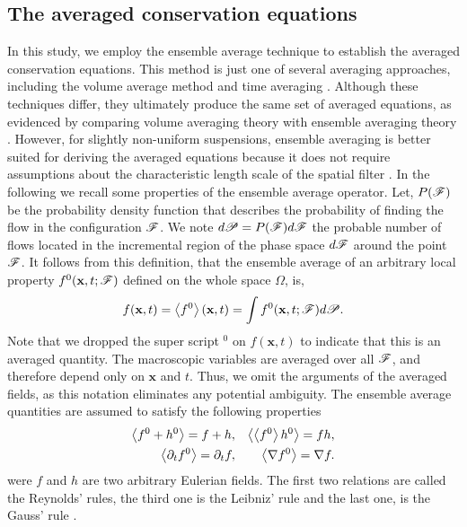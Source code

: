 \documentclass[11pt]{My_preprint}
\begin{document}
 \subsection{The averaged conservation equations}
\label{sec:avg_def}
In this study, we employ the ensemble average technique to establish the averaged conservation equations. 
This method is just one of several averaging approaches, including the volume average method \citep{jackson1997locally} and time averaging \citep{ishii2010thermo}. 
Although these techniques differ, they ultimately produce the same set of averaged equations, as evidenced by comparing volume averaging theory with ensemble averaging theory \citep{jackson1997locally,zhang1997momentum}. However, for slightly non-uniform suspensions, ensemble averaging is better suited for deriving the averaged equations because it does not require assumptions about the characteristic length scale of the spatial filter \citep{lhuillier1992ensemble}.
In the following we recall some properties of the ensemble average operator. 
Let, $P(\mathscr{F})$ be the probability density function that describes the probability of finding the flow in the configuration $\mathscr{F}$. 
We note $d\mathscr{P} = P(\mathscr{F}) d\mathscr{F}$ the probable number of flows located in the incremental region of the phase space $d\mathscr{F}$ around the point $\mathscr{F}$. 
It follows from this definition, that the ensemble average of an arbitrary local property $f^0(\textbf{x},t;\mathscr{F})$ defined on the whole space $\Omega$, is,
\begin{equation}
    f(\textbf{x},t)
    = \avg{f^0}(\textbf{x},t)
    =\int f^0(\textbf{x},t;\FF) d\mathscr{P}. 
    \label{eq:avg}
\end{equation}  
Note that we dropped the super script $^0$ on $f(\textbf{x},t)$ to indicate that this is an averaged quantity. 
The macroscopic variables are averaged over all $\mathscr{F}$, and therefore depend only on $\textbf{x}$ and $t$.
Thus, we omit the arguments of the averaged fields, as this notation eliminates any potential ambiguity. 
The ensemble average quantities are assumed to satisfy the following properties \citep{drew1983mathematical}
\begin{align}
    \avg{f^0+h^0} = f+h, 
    && \avg{\avg{f^0}h^0} = fh, \nonumber\\
    \avg{\pddt f^0} 
    = \pddt f,  
    &&\avg{\grad f^0}
    = \grad f. 
    \label{eq:avg_properties}
\end{align}
were $f$ and $h$ are two arbitrary Eulerian fields. 
The first two relations are called the Reynolds' rules, the third one is the Leibniz' rule and the last one, is the Gauss' rule \citep{drew1983mathematical}.
\end{document}
